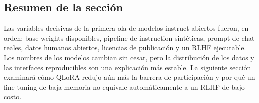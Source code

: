 
\subsection{Resumen de la sección}

Las variables decisivas de la primera ola de modelos instruct abiertos fueron, en orden: base weights disponibles, pipeline de instruction sintéticas, prompt de chat reales, datos humanos abiertos, licencias de publicación y un RLHF ejecutable. Los nombres de los modelos cambian sin cesar, pero la distribución de los datos y las interfaces reproducibles son una explicación más estable. La siguiente sección examinará cómo QLoRA redujo aún más la barrera de participación y por qué un fine-tuning de baja memoria no equivale automáticamente a un RLHF de bajo costo.
